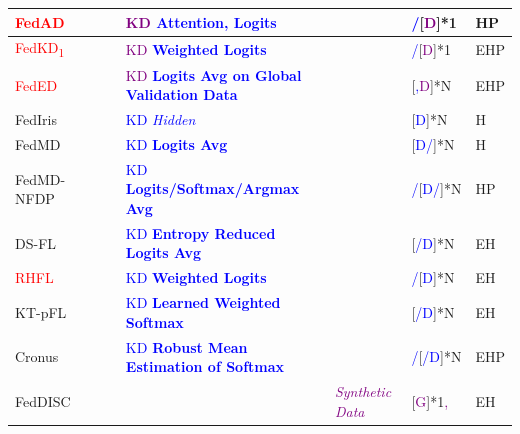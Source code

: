 \begin{table}[htp]
\begin{longtable}{|p{1.68cm}|p{1.2cm}|p{1.25cm}|p{5.0cm}|p{2.59cm}|p{1.2cm}|p{0.35cm}|}
    \textcolor{red}{FedAD}~\cite{gong2021ensemble} & & & \textcolor{purple}{KD} \textcolor{blue}{\textbf{Attention, Logits}}  & & \textcolor{blue}{/}[\textcolor{purple}{D}]*1 & HP \\ \hline %

    \textcolor{red}{FedKD\textsubscript{1}}~\cite{gong2022preserving} & & & \textcolor{purple}{KD} \textcolor{blue}{\textbf{Weighted Logits}} & &\textcolor{blue}{/}[\textcolor{purple}{D}]*1 & EHP \\ \hline %

    \textcolor{red}{FedED}~\cite{sui2020feded}& & & \textcolor{purple}{KD} \textcolor{blue}{\textbf{Logits Avg on Global Validation Data}} & &[\textcolor{blue}{,}\textcolor{purple}{D}]*N & EHP \\ \hline %

    FedIris~\cite{luo2022fediris} &&&\textcolor{blue}{KD \textit{Hidden}} &&[\textcolor{blue}{D}]*N & H \\ \hline %

    FedMD~\cite{li2019fedmd} &&&\textcolor{blue}{KD \textbf{Logits Avg}} &&[\textcolor{blue}{D/}]*N & H \\ \hline %

    FedMD-NFDP~\cite{sun2020federated}& & & \textcolor{blue}{KD \textbf{Logits/Softmax/Argmax Avg}} & & \textcolor{blue}{/}[\textcolor{blue}{D/}]*N & HP \\ \hline %

    DS-FL~\cite{itahara2021distillation}& & & \textcolor{blue}{KD \textbf{Entropy Reduced Logits Avg}} & &[\textcolor{blue}{/D}]*N & EH \\ \hline %

    \textcolor{red}{RHFL}~\cite{fang2022robust}& & & \textcolor{blue}{KD \textbf{Weighted Logits}} & & \textcolor{blue}{/}[\textcolor{blue}{D}]*N & EH \\ \hline

    KT-pFL~\cite{zhang2021parameterized}& & & \textcolor{blue}{KD \textbf{Learned Weighted Softmax}} & &[\textcolor{blue}{/D}]*N & EH \\ \hline

    Cronus~\cite{chang2021cronus}& & & \textcolor{blue}{KD} \textcolor{blue}{\textbf{Robust Mean Estimation of Softmax}} & & \textcolor{blue}{/}[\textcolor{blue}{/D}]*N & EHP \\ \hline

    FedDISC~\cite{yang2023exploring}& & & & \textcolor{purple}{\textit{Synthetic Data}} &[\textcolor{purple}{G}]*1\textcolor{purple}{,} & EH \\ \hline


\end{longtable}
\end{table}
